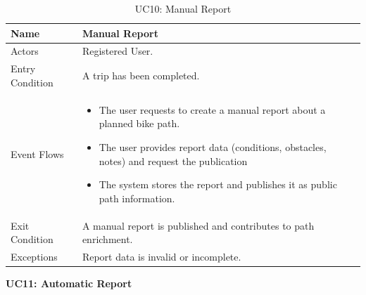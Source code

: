 \begin{table}[H]
    \centering
    \renewcommand{\arraystretch}{1.3}
    \begin{tabular}{|p{}|p{}|}
        \hline
        Name & \textbf{Manual Report} \\
        \hline
        Actors & Registered User. \\
        \hline
        Entry Condition & A trip has been completed. \\
        \hline
        Event Flows & \begin{itemize}[topsep=0pt, partopsep=0pt, leftmargin=*]
            \item The user requests to create a manual report about a planned bike path.
            \item The user provides report data (conditions, obstacles, notes) and request the publication
            \item The system stores the report and publishes it as public path information.
        \end{itemize} \\
        \hline
        Exit Condition & A manual report is published and contributes to path enrichment. \\
        \hline
        Exceptions & Report data is invalid or incomplete. \\
        \hline
    \end{tabular}
    \caption{UC10: Manual Report}
    \label{uc10}
\end{table}

\vspace{12pt}
\noindent
\textbf{UC11: Automatic Report}

